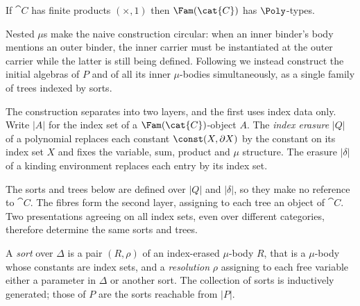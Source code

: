 \begin{proposition}
\label{prop:polynomial-types:fam-has-poly}
If $\cat{C}$ has finite products $(\times, 1)$ then $\Fam(\cat{C})$ has $\Poly$-types.
\end{proposition}

Nested $\mu$s make the naive construction circular: when an inner binder's body mentions an outer binder,
the inner carrier must be instantiated at the outer carrier while the latter is still being defined.
Following \citet{abbott2004} we instead construct the initial algebras of $P$ and of all its inner
$\mu$-bodies simultaneously, as a single family of trees indexed by sorts.

The construction separates into two layers, and the first uses index data only. Write $|A|$ for the
index set of a $\Fam(\cat{C})$-object $A$. The \emph{index erasure} $|Q|$ of a polynomial replaces
each constant $\const(X, \partial X)$ by the constant on its index set $X$ and fixes the variable,
sum, product and $\mu$ structure. The erasure $|\delta|$ of a kinding environment replaces each entry
by its index set.

The sorts and trees below are defined over $|Q|$ and $|\delta|$, so they make no reference to
$\cat{C}$. The fibres form the second layer, assigning to each tree an object of $\cat{C}$. Two
presentations agreeing on all index sets, even over different categories, therefore determine the
same sorts and trees.

\begin{definition}[Sort]
\label{def:polynomial-types:sort}
A \emph{sort} over $\Delta$ is a pair $(R, \rho)$ of an index-erased $\mu$-body $R$, that is a
$\mu$-body whose constants are index sets, and a \emph{resolution} $\rho$ assigning to each free
variable either a parameter in $\Delta$ or another sort. The collection of sorts is inductively
generated; those of $P$ are the sorts reachable from $|P|$.
\end{definition}

